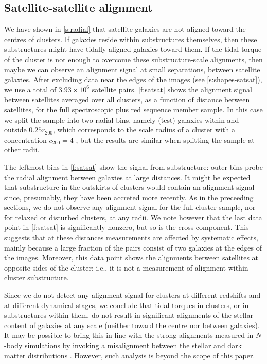 \subsection{Satellite-satellite alignment}\label{s:satsat}

We have shown in \cref{s:radial} that satellite galaxies are not aligned toward the centres 
of clusters. If galaxies reside within substructures themselves, then these substructures might 
have tidally aligned galaxies toward them. If the tidal torque of the cluster is not enough to 
overcome these substructure-scale alignments, then maybe we can observe an alignment signal at 
small separations, between satellite galaxies. After excluding data near the edges of the images 
(see \cref{s:shapes-satsat}), we use a total of $3.93\times10^6$ satellite pairs. \cref{f:satsat} 
shows the alignment signal between satellites averaged over all clusters, as a function of distance 
between satellites, for the full spectroscopic plus red sequence member sample. In this case we 
split the sample into two radial bins, namely (test) galaxies within and outside $0.25r_{200}$, 
which corresponds to the scale radius of a cluster with a concentration $c_{200}=4$ \citep[roughly 
what is expected for massive clusters; e.g.,][]{duffy08}, but the results are similar when 
splitting the sample at other radii.

The leftmost bins in \cref{f:satsat} show the signal from substructure: outer bins probe the 
radial alignment between galaxies at large distances. It might be expected that substructure in the 
outskirts of clusters would contain an alignment signal since, presumably, they have been accreted 
more recently. As in the preceeding sections, we do not observe any alignment signal for the full 
cluster sample, nor for relaxed or disturbed clusters, at any radii. We note however that the last 
data point in \cref{f:satsat} is significantly nonzero, but so is the cross component. This 
suggests that at these distances measurements are affected by systematic effects, mainly because a 
large fraction of the pairs consist of two galaxies at the edges of the images. Moreover, this 
data point shows the alignments between satellites at opposite sides of the cluster; i.e., it is 
not a measurement of alignment within cluster substructure.

Since we do not detect any alignment signal for clusters at different redshifts and at different 
dynamical stages, we conclude that tidal torques in clusters, or in substructures within them, do 
not result in significant alignments of the stellar content of galaxies at any scale (neither 
toward the centre nor between galaxies). It may be possible to bring this in line with the strong 
alignments measured in $N$-body simulations by invoking a misalignment between the stellar and dark 
matter distributions \citep[e.g.,][]{okumura09,tenneti14}. However, such analysis is beyond the 
scope of this paper.


